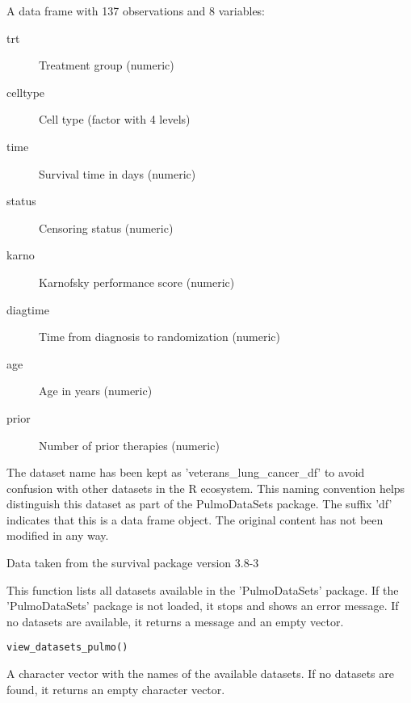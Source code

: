 \documentclass[a4paper]{book}
\begin{document}
\begin{Format}
A data frame with 137 observations and 8 variables:
\begin{description}

\item[trt] Treatment group (numeric)
\item[celltype] Cell type (factor with 4 levels)
\item[time] Survival time in days (numeric)
\item[status] Censoring status (numeric)
\item[karno] Karnofsky performance score (numeric)
\item[diagtime] Time from diagnosis to randomization (numeric)
\item[age] Age in years (numeric)
\item[prior] Number of prior therapies (numeric)

\end{description}

\end{Format}
%
\begin{Details}
The dataset name has been kept as 'veterans\_lung\_cancer\_df' to avoid confusion
with other datasets in the R ecosystem. This naming convention helps distinguish
this dataset as part of the PulmoDataSets package. The suffix 'df' indicates
that this is a data frame object. The original content has not been modified
in any way.
\end{Details}
%
\begin{Source}
Data taken from the survival package version 3.8-3
\end{Source}
%
\begin{Description}
This function lists all datasets available in the 'PulmoDataSets' package.
If the 'PulmoDataSets' package is not loaded, it stops and shows an error message.
If no datasets are available, it returns a message and an empty vector.
\end{Description}
%
\begin{Usage}
\begin{verbatim}
view_datasets_pulmo()
\end{verbatim}
\end{Usage}
%
\begin{Value}
A character vector with the names of the available datasets.
If no datasets are found, it returns an empty character vector.
\end{Value}
\end{document}
